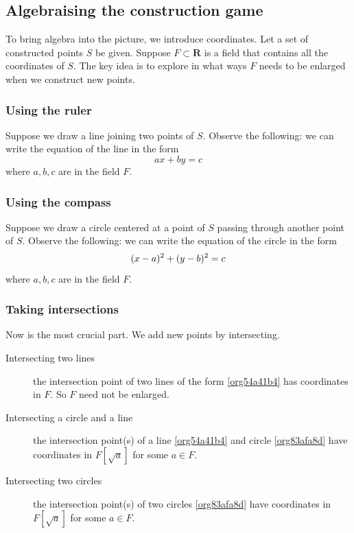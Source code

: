 \documentclass[11pt]{article}
\begin{document}
\subsection{Algebraising the construction game}
\label{sec:org8e852c0}
To bring algebra into the picture, we introduce coordinates.
Let a set of constructed points \(S\) be given.
Suppose \(F \subset \mathbf{R}\) is a field that contains all the coordinates of \(S\).
The key idea is to explore in what ways \(F\) needs to be enlarged when we construct new points.
\subsubsection{Using the ruler}
\label{sec:org17fdbc2}
Suppose we draw a line joining two points of \(S\).
Observe the following: we can write the equation of the line in the form
\begin{equation}
ax + by = c
\label{org54a41b4}
\end{equation}
where \(a,b,c\) are in the field \(F\).
\subsubsection{Using the compass}
\label{sec:org925511e}
Suppose we draw a circle centered at a point of \(S\) passing through another point of \(S\).
Observe the following: we can write the equation of the circle in the form
\begin{equation}
(x-a)\textsuperscript{2} + (y-b)\textsuperscript{2} = c
\label{org83afa8d}
\end{equation}
where \(a,b,c\) are in the field \(F\).
\subsubsection{Taking intersections}
\label{sec:org034876a}
Now is the most crucial part.  We add new points by intersecting.
\begin{description}
\item[{Intersecting two lines}] the intersection point of two lines of the form \ref{org54a41b4} has coordinates in \(F\).  So \(F\) need not be enlarged.
\item[{Intersecting a circle and a line}] the intersection point(s) of a line \ref{org54a41b4} and circle \ref{org83afa8d} have coordinates in \(F[\sqrt a]\) for some \(a \in F\).
\item[{Intersecting two circles}] the intersection point(s) of two circles \ref{org83afa8d} have coordinates in \(F[\sqrt a]\) for some \(a \in F\).
\end{description}
\end{document}
